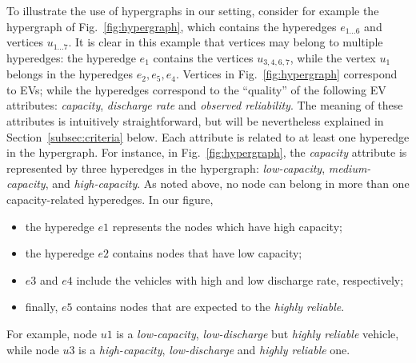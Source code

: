 To illustrate the use of hypergraphs in our setting, consider for example the hypergraph of Fig.~\ref{fig:hypergraph}, which contains the hyperedges $e_{1...6}$ and vertices $u_{1...7}$. It is clear in this example that vertices may belong to multiple hyperedges: the hyperedge $e_1$ contains the vertices $u_{3,4,6,7}$, while the vertex $u_1$ belongs in the hyperedges $e_2, e_5, e_4$. Vertices in Fig.~\ref{fig:hypergraph} correspond to EVs; while the hyperedges correspond to the ``quality'' of the following EV attributes: \textit{capacity}, {\em discharge rate} and \textit{observed reliability}. The meaning of these attributes is intuitively straightforward, but will be nevertheless explained in Section~\ref{subsec:criteria} below. Each attribute is related to at least one hyperedge in the hypergraph. For instance, in Fig.~\ref{fig:hypergraph}, the {\em capacity} attribute is represented by three hyperedges in the hypergraph: {\em low-capacity}, {\em medium-capacity}, and {\em high-capacity}. As noted above, no node can belong in more than one capacity-related hyperedges. In our figure, 
\begin{itemize}
	\item the hyperedge $e1$ represents the nodes which have high capacity;
	\item the hyperedge $e2$ contains nodes that have low capacity;
	\item $e3$ and $e4$ include the vehicles with high and low discharge rate, respectively;
	\item finally, $e5$ contains nodes that are expected to the {\em highly reliable}.
\end{itemize}
For example, node $u1$ is a {\em low-capacity}, {\em low-discharge} but {\em highly reliable} vehicle, while node $u3$ is a {\em high-capacity}, {\em low-discharge} and {\em highly reliable} one.




